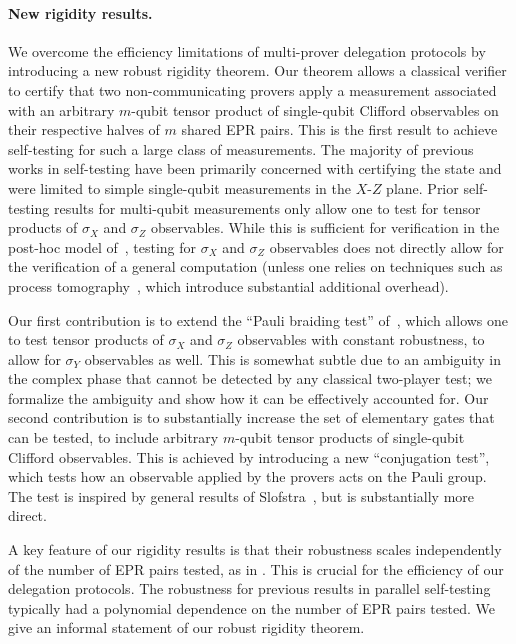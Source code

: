 \paragraph{New rigidity results.} We overcome the efficiency limitations of
multi-prover delegation protocols by introducing a new robust rigidity theorem. Our theorem allows a classical verifier to certify that two non-communicating provers apply a measurement associated with an arbitrary $m$-qubit tensor product of single-qubit Clifford observables on their respective halves of $m$ shared EPR pairs.
This is the first result to achieve self-testing for such a large class of
measurements. The majority of previous works in self-testing have been primarily
concerned with certifying the state and were limited to simple single-qubit
measurements in the $X$-$Z$ plane. Prior self-testing results for multi-qubit
measurements only allow one to test for tensor products of $\sigma_X$ and $\sigma_Z$
observables. While this is sufficient for verification in the post-hoc model
of~\cite{hajdusek2015posthoc}, testing for $\sigma_X$ and $\sigma_Z$ observables
does not directly allow for the verification of a general computation (unless
one relies on techniques such as process
tomography~\cite{reichardt2012classical}, which introduce substantial additional
overhead).  

Our first contribution is to extend the ``Pauli braiding test'' of~\cite{natarajan2016robust}, which allows one to test tensor products of $\sigma_X$ and $\sigma_Z$ observables with constant robustness, to allow for $\sigma_Y$ observables as well. This is somewhat subtle due to an ambiguity in the complex phase that cannot be detected by any classical two-player test; we formalize the ambiguity and show how it can be effectively accounted for. Our second contribution is to substantially increase the set of elementary gates that can be tested, to include arbitrary $m$-qubit tensor products of single-qubit Clifford observables. This is achieved by introducing a new ``conjugation test'', which tests how an observable applied by the provers acts on the Pauli group. The test is inspired by general results of Slofstra~\cite{slofstra2016tsirelson}, but is substantially more direct. 

 A key feature of our rigidity results is that their robustness scales independently of the number of EPR pairs tested, as in \cite{natarajan2016robust}. This is crucial for the efficiency of our delegation protocols. The robustness for previous results in parallel self-testing typically had a polynomial dependence on the number of EPR pairs tested. We give an informal statement of our robust rigidity theorem.
 
